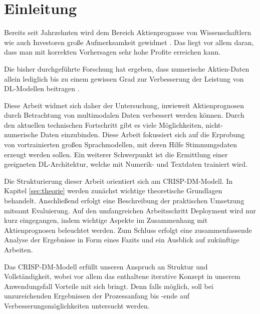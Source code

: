 \section{Einleitung}\label{sec:einleitung}

Bereits seit Jahrzehnten wird dem Bereich Aktienprognose von Wissenschaftlern wie auch Investoren große Aufmerksamkeit gewidmet \autocite[Kap. Introduction]{zhang2022transformer}. Das liegt vor allem daran, dass man mit korrekten Vorhersagen sehr hohe Profite erreichen kann.

Die bisher durchgeführte Forschung hat ergeben, dass numerische Aktien-Daten allein lediglich bis zu einem gewissen Grad zur Verbesserung der Leistung von \ac{DL}-Modellen beitragen \autocite[Kap. Introduction]{zhang2022transformer}.

Diese Arbeit widmet sich daher der Untersuchung, inwieweit Aktienprognosen durch Betrachtung von multimodalen Daten verbessert werden können. Durch den aktuellen technischen Fortschritt gibt es viele Möglichkeiten, nicht-numerische Daten einzubinden. Diese Arbeit fokussiert sich auf die Erprobung von vortrainierten großen Sprachmodellen, mit deren Hilfe Stimmungsdaten erzeugt werden sollen. Ein weiterer Schwerpunkt ist die Ermittlung einer geeigneten \ac{DL}-Architektur, welche mit Numerik- und Textdaten trainiert wird.

Die Strukturierung dieser Arbeit orientiert sich am \ac{CRISP-DM}-Modell. In Kapitel \ref{sec:theorie} werden zunächst wichtige theoretische Grundlagen behandelt. Anschließend erfolgt eine Beschreibung der praktischen Umsetzung mitsamt Evaluierung. Auf den umfangreichen Arbeitsschritt Deployment wird nur kurz eingegangen, indem wichtige Aspekte im Zusammenhang mit Aktienprognosen beleuchtet werden. Zum Schluss erfolgt eine zusammenfassende Analyse der Ergebnisse in Form eines Fazits und ein Ausblick auf zukünftige Arbeiten. 

Das \ac{CRISP-DM}-Modell erfüllt unseren Anspruch an Struktur und Vollständigkeit, wobei vor allem das enthaltene iterative Konzept in unserem Anwendungsfall Vorteile mit sich bringt. Denn falls möglich, soll bei unzureichenden Ergebnissen der Prozessanfang bis -ende auf Verbesserungsmöglichkeiten untersucht werden.